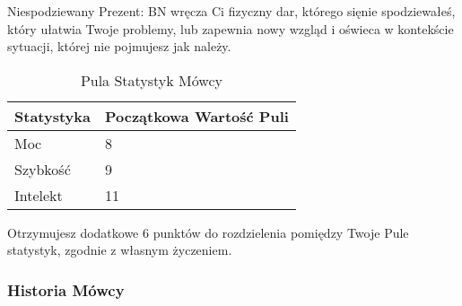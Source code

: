Niespodziewany Prezent: BN wręcza Ci fizyczny dar, którego sięnie spodziewałeś, który ułatwia Twoje problemy, lub zapewnia nowy wzgląd i oświeca w kontekście sytuacji, której nie pojmujesz jak należy.

\begin{table*}[t]
 \centering
 \begin{tabularx}{\textwidth}{ | X | X  |}
  \hline
    \textbf{Statystyka} & \textbf{Początkowa Wartość Puli} \\ \hline
    Moc & 8  \\ \hline
    Szybkość & 9  \\ \hline
    Intelekt & 11  \\ \hline
 \end{tabularx}
  \caption {Pula Statystyk Mówcy}
  \label {Pula Statystyk Mówcy}
 \end{table*}
 
Otrzymujesz dodatkowe 6 punktów do rozdzielenia pomiędzy Twoje Pule statystyk, zgodnie z własnym życzeniem.
 
\subsubsection{Historia Mówcy}

